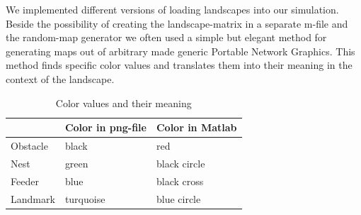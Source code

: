 \documentclass[11pt]{article}
\begin{document}
We implemented different versions of loading landscapes into our simulation. Beside the possibility of creating the landscape-matrix in a separate m-file and the random-map generator  we often used a simple but elegant method for generating maps out of arbitrary made generic Portable Network Graphics. This method finds specific color values and translates them into their meaning in the context of the landscape.

\begin{table}[h!]
\centering
\begin{tabular}{lll}
	\cmidrule[1pt]{2-3}
	& Color in png-file & Color in Matlab \\
	\midrule
Obstacle & black & red \\ \midrule
Nest & green & black circle \\ \midrule
Feeder & blue & black cross \\ \midrule
Landmark & turquoise & blue circle \\
\bottomrule  
\end{tabular}
\caption{Color values and their meaning}
\end{table}
\end{document}
